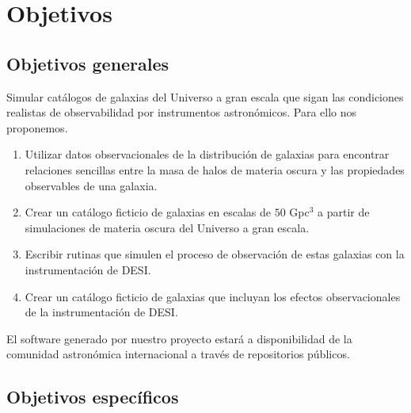 \section{Objetivos}

\subsection{Objetivos generales} 

Simular cat\'alogos de galaxias del Universo a gran escala que sigan
las condiciones realistas de observabilidad por instrumentos astron\'omicos. 
Para ello nos proponemos.


\begin{enumerate}
\item  Utilizar datos observacionales de la distribuci\'on de galaxias
  para encontrar relaciones sencillas entre la masa de halos de
  materia oscura y las  propiedades observables de una galaxia.
\item Crear un cat\'alogo ficticio de galaxias en escalas de $50$ Gpc$^3$
  a partir de simulaciones de materia oscura del Universo a gran escala.
\item Escribir rutinas que simulen el proceso de observaci\'on de
  estas galaxias con la instrumentaci\'on de DESI.
\item Crear un cat\'alogo ficticio de galaxias que incluyan los
  efectos observacionales de la instrumentaci\'on de DESI.
\end{enumerate}

El software generado por nuestro proyecto estar\'a a
disponibilidad  de la comunidad astron\'omica internacional a trav\'es
de repositorios p\'ublicos. 

\subsection{Objetivos espec\'ificos}


